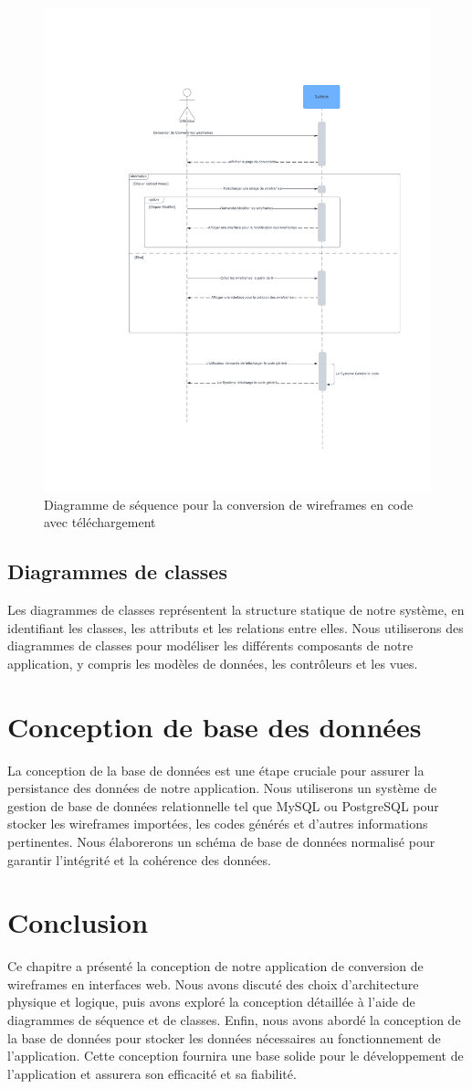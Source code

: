 \begin{figure}[H]
    \centering
    \includegraphics[width=0.5\linewidth]{images/Sequence diagram1 (2).pdf}
    \caption{Diagramme de séquence pour la conversion de wireframes en code avec téléchargement}
    \label{fig:sequence_diagram_download}
\end{figure}
\subsection{Diagrammes de classes}

Les diagrammes de classes représentent la structure statique de notre système, en identifiant les classes, les attributs et les relations entre elles. Nous utiliserons des diagrammes de classes pour modéliser les différents composants de notre application, y compris les modèles de données, les contrôleurs et les vues.

\section{Conception de base des données}

La conception de la base de données est une étape cruciale pour assurer la persistance des données de notre application. Nous utiliserons un système de gestion de base de données relationnelle tel que MySQL ou PostgreSQL pour stocker les wireframes importées, les codes générés et d'autres informations pertinentes. Nous élaborerons un schéma de base de données normalisé pour garantir l'intégrité et la cohérence des données.

\section{Conclusion}

Ce chapitre a présenté la conception de notre application de conversion de wireframes en interfaces web. Nous avons discuté des choix d'architecture physique et logique, puis avons exploré la conception détaillée à l'aide de diagrammes de séquence et de classes. Enfin, nous avons abordé la conception de la base de données pour stocker les données nécessaires au fonctionnement de l'application. Cette conception fournira une base solide pour le développement de l'application et assurera son efficacité et sa fiabilité.

